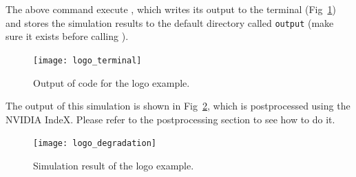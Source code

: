 The above command execute \biodeg{}, which writes its output to the terminal (Fig~\ref{fig:logo_terminal}) and stores the simulation results to the default directory called \verb|output| (make sure it exists before calling \biodeg{}). 

\begin{figure}[h]
\center \texttt{[image: logo\_terminal]}
\caption{Output of \biodeg{} code for the logo example.} \label{fig:logo_terminal}
\end{figure}

The output of this simulation is shown in Fig~\ref{fig:logo_degradation}, which is postprocessed using the NVIDIA IndeX. Please refer to the postprocessing section to see how to do it.

\begin{figure}[h]
\center \texttt{[image: logo\_degradation]}
\caption{Simulation result of the logo example.} \label{fig:logo_degradation}
\end{figure}
